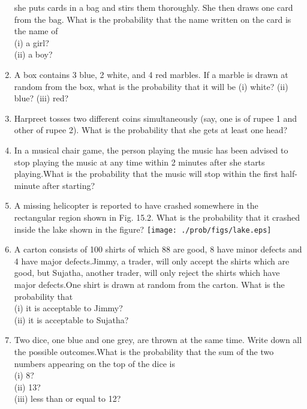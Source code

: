 \begin{enumerate}[label=\arabic*.,ref=\thesubsection.\theenumi]
she puts cards in a bag and stirs them thoroughly. She then draws one card from the
bag. What is the probability that the name written on the card is the name of\\
(i) a girl?\\
(ii) a boy?
\item  A box contains 3 blue, 2 white, and 4 red marbles. If a marble is drawn
at random from the box, what is the probability that it will be
(i) white? (ii) blue? (iii) red?
\item Harpreet tosses two different coins simultaneously (say, one is of rupee 1
and other of rupee 2). What is the probability that she gets at least one head?
\item In a musical chair game, the person playing the music has been
advised to stop playing the music at any time within 2 minutes after she starts playing.What is the probability that the music will stop within the first half-minute after starting?
\item A missing helicopter is reported to have crashed somewhere in the rectangular region shown in Fig. 15.2. What is the probability that it crashed inside the
lake shown in the figure?
\texttt{[image: ./prob/figs/lake.eps]}\\
\item A carton consists of 100 shirts of which 88 are good, 8 have minor defects and 4 have major defects.Jimmy, a trader, will only accept the shirts which are good, but Sujatha, another trader, will only reject the shirts which have major defects.One shirt is drawn at random from the carton. What is the probability that\\
(i) it is acceptable to Jimmy?\\
(ii) it is acceptable to Sujatha?
\item Two dice, one blue and one grey, are thrown at the same time. Write down all the possible outcomes.What is the probability that the sum of the two numbers appearing on the top of the dice is\\
(i) 8?\\
(ii) 13?\\ 
(iii) less than or equal to 12?\\\\

    \end{enumerate}
%
    
